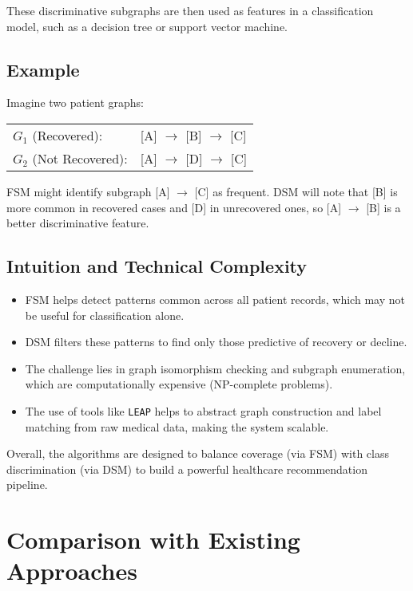 \documentclass[12pt]{article}
\begin{document}
These discriminative subgraphs are then used as features in a classification model, such as a decision tree or support vector machine.

\subsection*{Example}
Imagine two patient graphs:

\vspace{0.3em}
\begin{tabular}{ll}
$G_1$ (Recovered): & [A] $\rightarrow$ [B] $\rightarrow$ [C] \\
$G_2$ (Not Recovered): & [A] $\rightarrow$ [D] $\rightarrow$ [C]
\end{tabular}

\vspace{0.3em}
FSM might identify subgraph [A] $\rightarrow$ [C] as frequent. DSM will note that [B] is more common in recovered cases and [D] in unrecovered ones, so [A] $\rightarrow$ [B] is a better discriminative feature.

\subsection*{Intuition and Technical Complexity}
\begin{itemize}
    \item FSM helps detect patterns common across all patient records, which may not be useful for classification alone.
    \item DSM filters these patterns to find only those predictive of recovery or decline.
    \item The challenge lies in graph isomorphism checking and subgraph enumeration, which are computationally expensive (NP-complete problems).
    \item The use of tools like \texttt{LEAP} helps to abstract graph construction and label matching from raw medical data, making the system scalable.
\end{itemize}

Overall, the algorithms are designed to balance coverage (via FSM) with class discrimination (via DSM) to build a powerful healthcare recommendation pipeline.

\section{Comparison with Existing Approaches}
\end{document}
